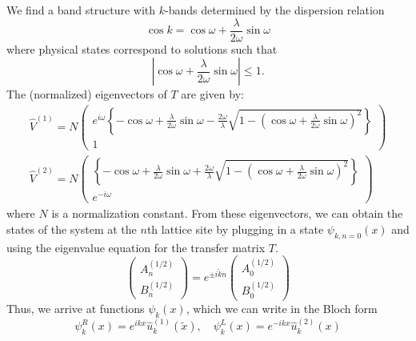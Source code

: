 We find a band structure with $k$-bands determined by the dispersion relation
\begin{equation}
    \cos{k} = \cos{\omega} + \frac{\lambda}{2\omega}\sin{\omega}
\end{equation}
%
where physical states correspond to solutions such that
\begin{equation}\label{eq:band_condition}
    \left|\cos{\omega} + \frac{\lambda}{2\omega}\sin{\omega}\right|\leq 1.
\end{equation}
%
The (normalized) eigenvectors of $T$ are given by:
\begin{gather}
    \hat{V}^{(1)}
    = N
    \begin{pmatrix}
    e^{i\omega}\left\lbrace-\cos{\omega} + \frac{\lambda}{2\omega}\sin{\omega} - \frac{2\omega}{\lambda}\sqrt{1-\left(\cos{\omega+\frac{\lambda}{2\omega}\sin{\omega}}\right)^2}
    \right\rbrace \\ 1 \end{pmatrix} \\
    \hat{V}^{(2)}
    = N
    \begin{pmatrix}
    \left\lbrace-\cos{\omega} + \frac{\lambda}{2\omega}\sin{\omega} + \frac{2\omega}{\lambda}\sqrt{1-\left(\cos{\omega+\frac{\lambda}{2\omega}\sin{\omega}}\right)^2}
    \right\rbrace \\ e^{-i\omega} \end{pmatrix}
\end{gather}
%
where $N$ is a normalization constant. From these eigenvectors, we can obtain the states of the system at the $n$th lattice site by plugging in a state $\psi_{k,n=0}(x)$ and using the eigenvalue equation for the transfer matrix $T$.
\begin{equation}
    \begin{pmatrix}
    A_n^{(1/2)} \\ B_n^{(1/2)}
    \end{pmatrix}
    = e^{\pm i\tilde{k}n} 
    \begin{pmatrix}
    A_0^{(1/2)} \\ B_0^{(1/2)}
    \end{pmatrix}
\end{equation}
%
Thus, we arrive at functions $\psi_{k}(x)$, which we can write in the Bloch form
\begin{equation}\label{eq:bloch_waves}
    \psi_{k}^R (x) =e^{ikx} \hat{u}_{k}^{(1)}(\tilde{x}), \hspace{12pt}  \psi_{k}^L(x) =e^{-ikx} \hat{u}_{k}^{(2)}(x) 
\end{equation}
